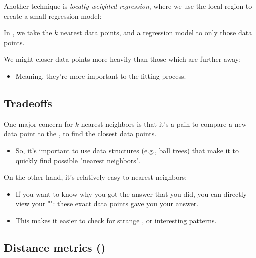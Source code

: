         Another technique is \textit{locally weighted regression}, where we use the local region to create a small regression model:\\

        \begin{definition}
            In , we take the $k$ nearest data points, and  a regression model to only those data points. 

            We might  closer data points more heavily than those which are further away:

            \begin{itemize}
                \item Meaning, they're more important to the fitting process.
            \end{itemize}
        \end{definition}




    \phantom{}

    \subsection{Tradeoffs}

        One major concern for $k$-nearest neighbors is that it's a pain to compare a new data point to the , to find the closest data points.

        \begin{itemize}
            \item So, it's important to use data structures (e.g., ball trees) that make it  to quickly find possible "nearest neighbors".
        \end{itemize}

        On the other hand, it's relatively easy to  nearest neighbors:

        \begin{itemize}
            \item If you want to know why you got the answer that you did, you can directly view your "": these exact data points gave you your answer.
            \item This makes it easier to check for strange , or interesting patterns.
        \end{itemize}
    
    \pagebreak

    \subsection{Distance metrics ()}

